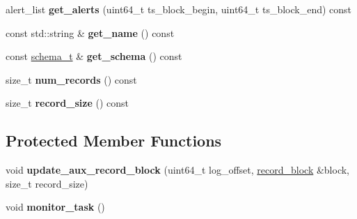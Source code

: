 \begin{DoxyCompactItemize}
alert\+\_\+list {\bfseries get\+\_\+alerts} (uint64\+\_\+t ts\+\_\+block\+\_\+begin, uint64\+\_\+t ts\+\_\+block\+\_\+end) const
\item 
\mbox{\label{classdialog_1_1dialog__table_acf4a73a99a547944a581c334cff4231f}} 
const std\+::string \& {\bfseries get\+\_\+name} () const
\item 
\mbox{\label{classdialog_1_1dialog__table_ae4c87751732e230c325231cc1a2b3443}} 
const \hyperlink{classdialog_1_1schema__t}{schema\+\_\+t} \& {\bfseries get\+\_\+schema} () const
\item 
\mbox{\label{classdialog_1_1dialog__table_a664e36dad0512718d74d134b3c9fd45c}} 
size\+\_\+t {\bfseries num\+\_\+records} () const
\item 
\mbox{\label{classdialog_1_1dialog__table_a0a301caeb2a122ebec76a5601c3dba95}} 
size\+\_\+t {\bfseries record\+\_\+size} () const
\end{DoxyCompactItemize}
\subsection*{Protected Member Functions}
\begin{DoxyCompactItemize}
\item 
\mbox{\label{classdialog_1_1dialog__table_aa202a1ffaeb700c37dcca44652e66aed}} 
void {\bfseries update\+\_\+aux\+\_\+record\+\_\+block} (uint64\+\_\+t log\+\_\+offset, \hyperlink{structdialog_1_1record__block}{record\+\_\+block} \&block, size\+\_\+t record\+\_\+size)
\item 
\mbox{\label{classdialog_1_1dialog__table_ab95356f0ef7c418dee3b9c5073717c1b}} 
void {\bfseries monitor\+\_\+task} ()
\end{DoxyCompactItemize}
